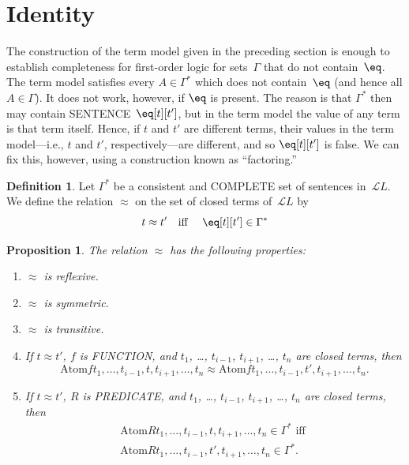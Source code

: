 \documentclass[10pt,a4paper]{article}
\newcommand*{\olup}[1]{\MakeUppercase{#1}}
\theoremstyle{plain}
\newtheorem{prop}[thm]{Proposition}
\theoremstyle{definition}
\newtheorem{defn}[thm]{Definition}
\theoremstyle{remark}
\newenvironment{explain}{}{}
\newcommand*{\olfileid}[3]{}
\newcommand*{\olsection}[1]{\section*{#1}}
\newcommand*{\ollabel}[1]{\label{#1}}
\providecommand{\Lang}{\ensuremath{\mathcal{L}}}
\providecommand{\Atom}{\mathrm{Atom}}
\begin{document}
\olfileid{fol}{com}{ide}
\olsection{Identity}

\begin{explain}
The construction of the term model given in the preceding section is
enough to establish completeness for first-order logic for
sets~$\Gamma$ that do not contain~$\eq$.  The term model satisfies
every $A \in \Gamma^*$ which does not contain~$\eq$ (and hence all
$A \in \Gamma$).  It does not work, however, if $\eq$ is present.
The reason is that $\Gamma^*$ then may contain
\olup{sentence}~$\eq[t][t']$, but in the term model the value of any
term is that term itself.  Hence, if $t$ and $t'$ are different terms,
their values in the term model---i.e., $t$ and $t'$,
respectively---are different, and so $\eq[t][t']$ is false.  We can
fix this, however, using a construction known as ``factoring.''
\end{explain}

\begin{defn}
  Let $\Gamma^*$ be a consistent and \olup{complete} set of sentences
  in~$\Lang L$.  We define the relation $\approx$ on the set of closed
  terms of~$\Lang L$ by
  \[
  t \approx t' \text{\quad iff \quad} \eq[t][t'] \in \Gamma^*
  \]
\end{defn}

\begin{prop}
\ollabel{prop:approx-equiv}
The relation $\approx$ has the following properties:
\begin{enumerate}
\item $\approx$ is reflexive.
\item $\approx$ is symmetric.
\item  $\approx$ is transitive.
\item If $t \approx t'$, $f$ is \olup{function}, and $t_1$, \dots,
  $t_{i-1}$, $t_{i+1}$, \dots, $t_n$ are closed terms, then
\[
\Atom{f}{t_1,\dots, t_{i-1}, t, t_{i+1}, \dots, t_n} \approx
\Atom{f}{t_1,\dots, t_{i-1}, t', t_{i+1}, \dots, t_n}.
\]
\item If $t \approx t'$, $R$ is \olup{predicate}, and $t_1$, \dots,
  $t_{i-1}$, $t_{i+1}$, \dots, $t_n$ are closed terms, then
\begin{multline*}
\Atom{R}{t_1,\dots, t_{i-1}, t, t_{i+1}, \dots, t_n} \in \Gamma^* \text{ iff } \\
\Atom{R}{t_1,\dots, t_{i-1}, t', t_{i+1}, \dots, t_n} \in \Gamma^*.
\end{multline*}
\end{enumerate}
\end{prop}
\end{document}
